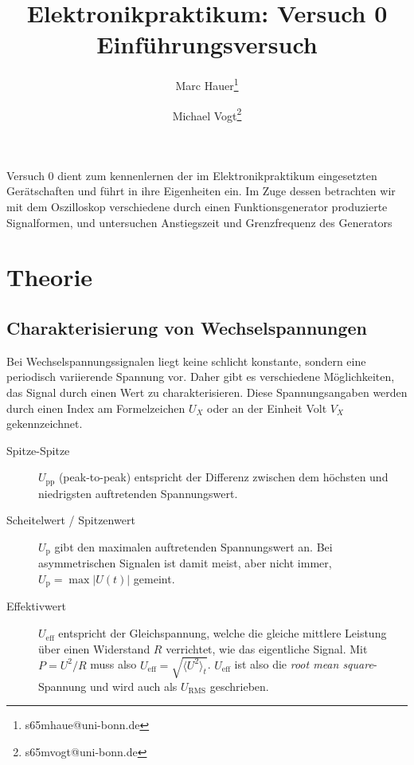 \documentclass{article}
\title{Elektronikpraktikum: Versuch 0 \\ Einführungsversuch}
\author[1]{Marc Hauer\thanks{s65mhaue@uni-bonn.de}}
\author[1]{Michael Vogt\thanks{s65mvogt@uni-bonn.de}}
\affil[1]{Uni Bonn}
\begin{document}
\maketitle
\tableofcontents
\newpage
{}

\pagestyle{fancy}
\fancyhead[R]{\thepage}
\fancyhead[L]{\leftmark}


Versuch 0 dient zum kennenlernen der im Elektronikpraktikum eingesetzten Gerätschaften und führt in ihre Eigenheiten ein.
Im Zuge dessen betrachten wir mit dem Oszilloskop verschiedene durch einen Funktionsgenerator produzierte Signalformen,
und untersuchen Anstiegszeit und Grenzfrequenz des Generators

\section{Theorie}
\subsection{Charakterisierung von Wechselspannungen}
Bei Wechselspannungssignalen liegt keine schlicht konstante, sondern eine periodisch variierende Spannung vor.
Daher gibt es verschiedene Möglichkeiten, das Signal durch einen Wert zu charakterisieren.
Diese Spannungsangaben werden durch einen Index am Formelzeichen $U_X$ oder an der Einheit Volt $V_X$ gekennzeichnet.
\begin{description} 
  \item[Spitze-Spitze] $U_\mathrm{pp}$ (peak-to-peak) entspricht der Differenz zwischen
  dem höchsten und niedrigsten auftretenden Spannungswert.
  \item[Scheitelwert / Spitzenwert] $U_\mathrm{p}$ gibt den maximalen auftretenden Spannungswert an. Bei asymmetrischen Signalen
  ist damit meist, aber nicht immer, $U_\mathrm{p} = \max{\lvert U(t) \rvert}$ gemeint.
  \item[Effektivwert] $U_\mathrm{eff}$ entspricht der Gleichspannung, welche die gleiche mittlere Leistung über einen Widerstand
  $R$ verrichtet, wie das eigentliche Signal. Mit $P=U^2/R$ muss also $U_\mathrm{eff} = \sqrt{\langle U^2 \rangle_t}$.
  $U_\mathrm{eff}$ ist also die \textit{root mean square}-Spannung und wird auch als $U_\mathrm{RMS}$ geschrieben.
\end{description} 
\end{document}
